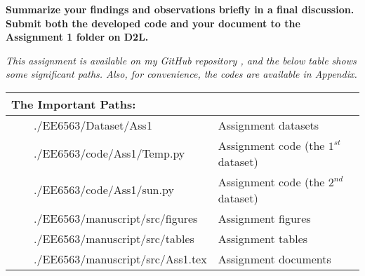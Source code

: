 \item \textbf{Summarize your findings and observations briefly in a final discussion. Submit both the developed code and your document to the Assignment 1 folder on D2L.}

\textit{This assignment is available on my GitHub repository \cite{SKazemii/EE6563}, and the below table shows some significant paths. Also, for convenience, the codes are available in Appendix.}

\begin{table}[H]
\centering
\begin{tabular}{|l|l|}
\hline
\multicolumn{2}{|l|}{The Important Paths:        } \\ \hline
\ \ \ \    ./EE6563/Dataset/Ass1             & Assignment datasets\\ \hline
\ \ \ \    ./EE6563/code/Ass1/Temp.py         & Assignment code (the $1^{st}$ dataset)\\ \hline
\ \ \ \    ./EE6563/code/Ass1/sun.py        & Assignment code (the $2^{nd}$ dataset)\\ \hline
\ \ \ \    ./EE6563/manuscript/src/figures   & Assignment figures\\ \hline
\ \ \ \    ./EE6563/manuscript/src/tables    & Assignment tables\\ \hline
\ \ \ \    ./EE6563/manuscript/src/Ass1.tex  & Assignment documents\\ \hline
\end{tabular}
\end{table}


